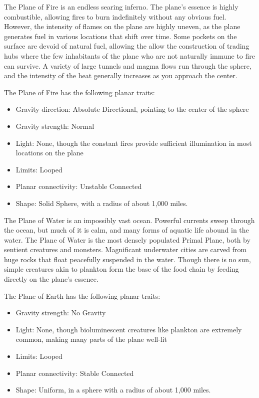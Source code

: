             The Plane of Fire is an endless searing inferno.
            The plane's essence is highly combustible, allowing fires to burn indefinitely without any obvious fuel.
            However, the intensity of flames on the plane are highly uneven, as the plane generates fuel in various locations that shift over time.
            Some pockets on the surface are devoid of natural fuel, allowing the allow the construction of trading hubs where the few inhabitants of the plane who are not naturally immune to fire can survive.
            A variety of large tunnels and magma flows run through the sphere, and the intensity of the heat generally increases as you approach the center.

            The Plane of Fire has the following planar traits:
            \begin{itemize}
                \item Gravity direction: Absolute Directional, pointing to the center of the sphere
                \item Gravity strength: Normal
                \item Light: None, though the constant fires provide sufficient illumination in most locations on the plane
                \item Limits: Looped
                \item Planar connectivity: Unstable Connected
                \item Shape: Solid Sphere, with a radius of about 1,000 miles.
            \end{itemize}

            The Plane of Water is an impossibly vast ocean.
            Powerful currents sweep through the ocean, but much of it is calm, and many forms of aquatic life abound in the water.
            The Plane of Water is the most densely populated Primal Plane, both by sentient creatures and monsters.
            Magnificant underwater cities are carved from huge rocks that float peacefully suspended in the water.
            Though there is no sun, simple creatures akin to plankton form the base of the food chain by feeding directly on the plane's essence.

            The Plane of Earth has the following planar traits:
            \begin{itemize}
                \item Gravity strength: No Gravity
                \item Light: None, though bioluminescent creatures like plankton are extremely common, making many parts of the plane well-lit
                \item Limits: Looped
                \item Planar connectivity: Stable Connected
                \item Shape: Uniform, in a sphere with a radius of about 1,000 miles.
            \end{itemize}

